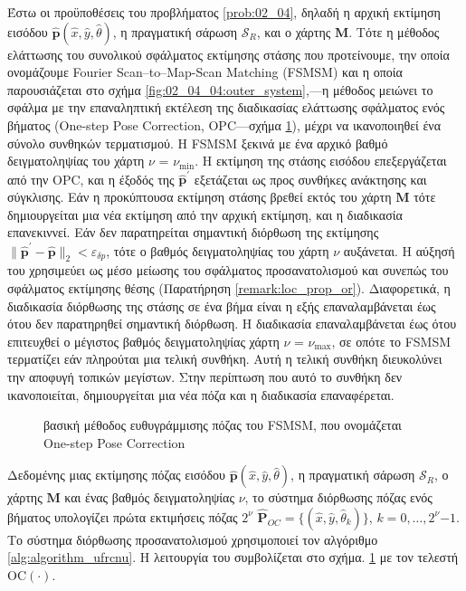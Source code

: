 Έστω οι προϋποθέσεις του προβλήματος \ref{prob:02_04}, δηλαδή
η αρχική εκτίμηση εισόδου $\hat{\bm{p}}(\hat{x}, \hat{y}, \hat{\theta})$,
η πραγματική σάρωση $\mathcal{S}_R$, και ο χάρτης $\bm{M}$. Τότε
η μέθοδος ελάττωσης του συνολικού σφάλματος εκτίμησης στάσης που προτείνουμε,
την οποία ονομάζουμε Fourier Scan--to--Map-Scan Matching (FSMSM) και η οποία
παρουσιάζεται στο σχήμα \ref{fig:02_04_04:outer_system},---η μέθοδος μειώνει το
σφάλμα με την επαναληπτική εκτέλεση της διαδικασίας ελάττωσης σφάλματος ενός
βήματος (One-step Pose Correction, OPC---σχήμα \ref{fig:02_04_04:inner_system}),
μέχρι να ικανοποιηθεί ένα σύνολο συνθηκών τερματισμού. Η FSMSM ξεκινά με ένα
αρχικό βαθμό δειγματοληψίας του χάρτη $\nu$ = $\nu_{\min}$. Η εκτίμηση της
στάσης εισόδου επεξεργάζεται από την OPC, και η έξοδός της
$\hat{\bm{p}}^\prime$ εξετάζεται ως προς συνθήκες ανάκτησης και
σύγκλισης. Εάν η προκύπτουσα εκτίμηση στάσης βρεθεί εκτός του χάρτη $\bm{M}$
τότε δημιουργείται μια νέα εκτίμηση από την αρχική
εκτίμηση, και η διαδικασία επανεκιννεί. Εάν δεν παρατηρείται σημαντική
διόρθωση της εκτίμησης
$\|\hat{\bm{p}}^\prime-\hat{\bm{p}}\|_2 < \varepsilon_{\delta p}$, τότε ο
βαθμός δειγματοληψίας του χάρτη $\nu$ αυξάνεται. Η αύξησή του χρησιμεύει ως
μέσο μείωσης του σφάλματος προσανατολισμού και συνεπώς του σφάλματος εκτίμησης
θέσης (Παρατήρηση \ref{remark:loc_prop_or}). Διαφορετικά, η διαδικασία
διόρθωσης της στάσης σε ένα βήμα είναι η εξής επαναλαμβάνεται έως ότου δεν
παρατηρηθεί σημαντική διόρθωση. Η διαδικασία επαναλαμβάνεται έως ότου
επιτευχθεί ο μέγιστος βαθμός δειγματοληψίας χάρτη $\nu$ = $\nu_{\max}$, σε
οπότε το FSMSM τερματίζει εάν πληρούται μια τελική συνθήκη. Αυτή η τελική
συνθήκη διευκολύνει την αποφυγή τοπικών μεγίστων. Στην περίπτωση που αυτό το
συνθήκη δεν ικανοποιείται, δημιουργείται μια νέα πόζα και η διαδικασία
επαναφέρεται.

\begin{figure}[h]\centering
  
  \caption{\small  βασική μέθοδος ευθυγράμμισης πόζας του FSMSM, που ονομάζεται
           One-step Pose Correction}
  \label{fig:02_04_04:inner_system}
\end{figure}


Δεδομένης μιας εκτίμησης πόζας εισόδου $\hat{\bm{p}}(\hat{x}, \hat{y},
\hat{\theta})$, η πραγματική σάρωση $\mathcal{S}_R$, ο χάρτης $\bm{M}$ και ένας
βαθμός δειγματοληψίας $\nu$, το σύστημα διόρθωσης πόζας ενός βήματος υπολογίζει
πρώτα εκτιμήσεις πόζας $2^\nu$ $\hat{\bm{P}}_{OC} = \{(\hat{x}, \hat{y},
\hat{\theta}_k)\}$, $k = 0,\dots,2^\nu$$-$$1$. Το σύστημα διόρθωσης
προσανατολισμού χρησιμοποιεί τον αλγόριθμο \ref{alg:algorithm_ufrcnu}. Η
λειτουργία του συμβολίζεται στο σχήμα.  \ref{fig:02_04_04:inner_system} με τον τελεστή
OC$(\cdot)$.

